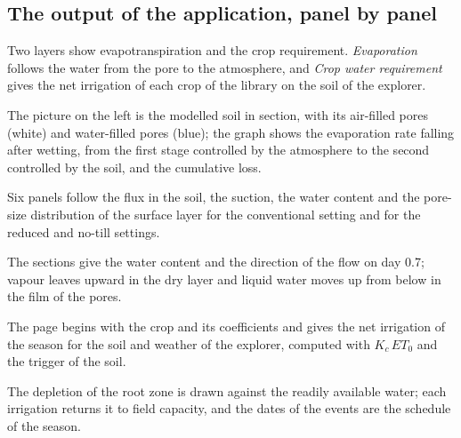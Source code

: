\subsection{The output of the application, panel by panel}
Two layers show evapotranspiration and the crop requirement. \emph{Evaporation} follows the water from the pore to the atmosphere, and \emph{Crop water requirement} gives the net irrigation of each crop of the library on the soil of the explorer.

The picture on the left is the modelled soil in section, with its air-filled pores (white) and water-filled pores (blue); the graph shows the evaporation rate falling after wetting, from the first stage controlled by the atmosphere to the second controlled by the soil, and the cumulative loss.


Six panels follow the flux in the soil, the suction, the water content and the pore-size distribution of the surface layer for the conventional setting and for the reduced and no-till settings.


The sections give the water content and the direction of the flow on day 0.7; vapour leaves upward in the dry layer and liquid water moves up from below in the film of the pores.


The page begins with the crop and its coefficients and gives the net irrigation of the season for the soil and weather of the explorer, computed with $K_c\,ET_0$ and the trigger of the soil.


The depletion of the root zone is drawn against the readily available water; each irrigation returns it to field capacity, and the dates of the events are the schedule of the season.


